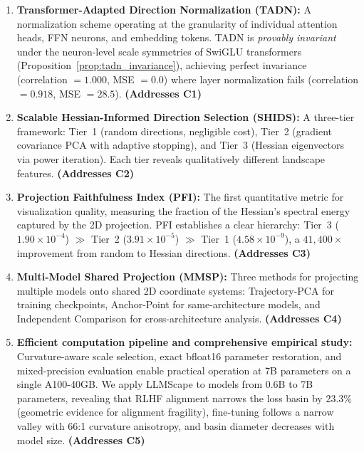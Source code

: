 \documentclass{article}
\begin{document}
\begin{enumerate}
    \item \textbf{Transformer-Adapted Direction Normalization (TADN):} A normalization scheme operating at the granularity of individual attention heads, FFN neurons, and embedding tokens. TADN is \emph{provably invariant} under the neuron-level scale symmetries of SwiGLU transformers (Proposition~\ref{prop:tadn_invariance}), achieving perfect invariance (correlation $= 1.000$, MSE $= 0.0$) where layer normalization fails (correlation $= 0.918$, MSE $= 28.5$). \textbf{(Addresses C1)}

    \item \textbf{Scalable Hessian-Informed Direction Selection (SHIDS):} A three-tier framework: Tier~1 (random directions, negligible cost), Tier~2 (gradient covariance PCA with adaptive stopping), and Tier~3 (Hessian eigenvectors via power iteration). Each tier reveals qualitatively different landscape features. \textbf{(Addresses C2)}

    \item \textbf{Projection Faithfulness Index (PFI):} The first quantitative metric for visualization quality, measuring the fraction of the Hessian's spectral energy captured by the 2D projection. PFI establishes a clear hierarchy: Tier~3 ($1.90 \times 10^{-4}$) $\gg$ Tier~2 ($3.91 \times 10^{-5}$) $\gg$ Tier~1 ($4.58 \times 10^{-9}$), a $41{,}400\times$ improvement from random to Hessian directions. \textbf{(Addresses C3)}

    \item \textbf{Multi-Model Shared Projection (MMSP):} Three methods for projecting multiple models onto shared 2D coordinate systems: Trajectory-PCA for training checkpoints, Anchor-Point for same-architecture models, and Independent Comparison for cross-architecture analysis. \textbf{(Addresses C4)}

    \item \textbf{Efficient computation pipeline and comprehensive empirical study:} Curvature-aware scale selection, exact bfloat16 parameter restoration, and mixed-precision evaluation enable practical operation at 7B parameters on a single A100-40GB. We apply LLMScape to models from 0.6B to 7B parameters, revealing that RLHF alignment narrows the loss basin by 23.3\% (geometric evidence for alignment fragility), fine-tuning follows a narrow valley with 66:1 curvature anisotropy, and basin diameter decreases with model size. \textbf{(Addresses C5)}
\end{enumerate}
\end{document}
